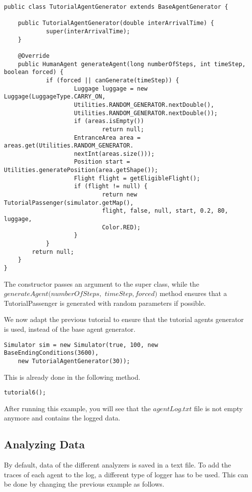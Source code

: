 \documentclass{article}
\begin{document}
\begin{verbatim}
public class TutorialAgentGenerator extends BaseAgentGenerator {

	public TutorialAgentGenerator(double interArrivalTime) {
		    super(interArrivalTime);
	}

	@Override
	public HumanAgent generateAgent(long numberOfSteps, int timeStep, boolean forced) {
	    	if (forced || canGenerate(timeStep)) {
        		    Luggage luggage = new Luggage(LuggageType.CARRY_ON, 
        		    Utilities.RANDOM_GENERATOR.nextDouble(),
        		    Utilities.RANDOM_GENERATOR.nextDouble());
        			if (areas.isEmpty())
        				    return null;
        			EntranceArea area = areas.get(Utilities.RANDOM_GENERATOR.
        			nextInt(areas.size()));
        			Position start = Utilities.generatePosition(area.getShape());
        			Flight flight = getEligibleFlight();
        			if (flight != null) {
        				    return new TutorialPassenger(simulator.getMap(),
        				    flight, false, null, start, 0.2, 80, luggage, 
        				    Color.RED);
        			}
		    }
		return null;
	}
}
\end{verbatim}

The constructor passes an argument to the super class, while the $generateAgent(numberOfSteps,$ $timeStep, forced)$ method ensures that a TutorialPassenger is generated with random parameters if possible.

We now adapt the previous tutorial to ensure that the tutorial agents generator is used, instead of the base agent generator.

\begin{verbatim}
Simulator sim = new Simulator(true, 100, new BaseEndingConditions(3600),
	new TutorialAgentGenerator(30));
\end{verbatim}

This is already done in the following method.

\begin{verbatim}
tutorial6();
\end{verbatim}

After running this example, you will see that the $agentLog.txt$ file is not empty anymore and contains the logged data.

\subsection{Analyzing Data} \label{sec:analyzing}
By default, data of the different analyzers is saved in a text file. To add the traces of each agent to the log, a different type of logger has to be used. This can be done by changing the previous example as follows.
\end{document}
